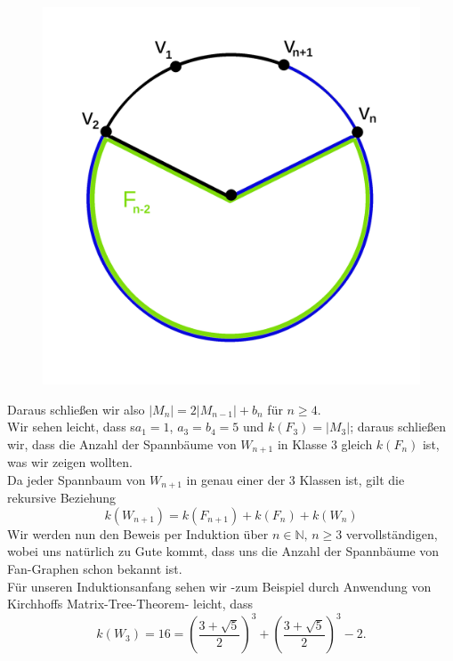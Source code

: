 \begin{figure}[H]
\begin{minipage}{0.45\textwidth}
        \includegraphics[width=1\textwidth]{mn3.png}
        \caption{}
 \label{mn3} %
    \end{minipage}
\end{figure}
Daraus schließen wir also $|M_{n}|=2|M_{n-1}|+b_{n}$ für $n\geq4$.\\
Wir sehen leicht, dass s$a_1=1$, $a_3=b_4=5$ und $\mathit{k}\left(F_3\right)=|M_3|$; daraus schließen wir, dass die Anzahl der Spannbäume von $W_{n+1}$ in Klasse 3 gleich $\mathit{k}\left(F_{n}\right)$ ist, was wir zeigen wollten.\\
Da jeder Spannbaum von $W_{n+1}$ in genau einer der 3 Klassen ist, gilt die rekursive Beziehung
\begin{equation}
\mathit{k}\left(W_{n+1}\right) = \mathit{k}\left(F_{n+1}\right) + \mathit{k}\left(F_n\right) + \mathit{k}\left(W_n\right)
\label{eq:wrek}
\end{equation}
Wir werden nun den Beweis per Induktion über $n \in \mathbb{N}, \, n \geq 3$ vervollständigen, wobei uns natürlich zu Gute kommt, dass uns die Anzahl der Spannbäume von Fan-Graphen schon bekannt ist.\\
Für unseren Induktionsanfang sehen wir -zum Beispiel durch Anwendung von Kirchhoffs Matrix-Tree-Theorem- leicht, dass \begin{equation}
\mathit{k}\left(W_3\right) = 16 = \left(\frac{3+\sqrt{5}}{2}\right)^3+\left(\frac{3+\sqrt{5}}{2}\right)^3-2.
\end{equation}
